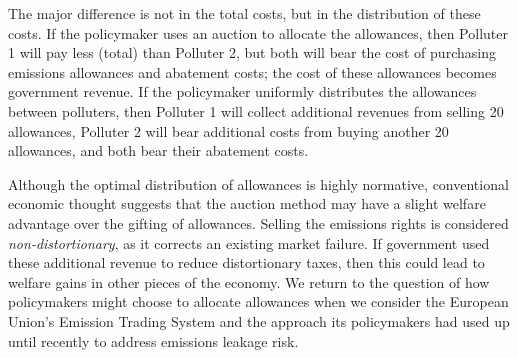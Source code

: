 The major difference is not in the total costs, but in the distribution of these costs. If the policymaker uses an auction to allocate the allowances, then Polluter 1 will pay less (total) than Polluter 2, but both will bear the cost of purchasing emissions allowances and abatement costs; the cost of these allowances becomes government revenue. If the policymaker uniformly distributes the allowances between polluters, then Polluter 1 will collect additional revenues from selling 20 allowances, Polluter 2 will bear additional costs from buying another 20 allowances, and both bear their abatement costs. 

Although the optimal distribution of allowances is highly normative, conventional economic thought suggests that the auction method may have a slight welfare advantage over the gifting of allowances. Selling the emissions rights is considered \emph{non-distortionary}, as it corrects an existing market failure. If government used these additional revenue to reduce distortionary taxes, then this could lead to welfare gains in other pieces of the economy. We return to the question of how policymakers might choose to allocate allowances when we consider the European Union's Emission Trading System and the approach its policymakers had used up until recently to address emissions leakage risk.

